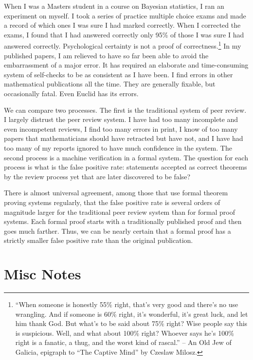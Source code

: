 \documentclass{llncs}
\begin{document}
When I was a Masters student in a course on Bayesian statistics, I ran an experiment on myself.   I took a series of practice multiple choice exams and made a record of which ones I was sure I had marked correctly.  When I corrected the exams, I found that I had answered correctly only 95\% of those I was sure I had answered correctly.  Psychological certainty is not a proof of correctness.\footnote{``When someone is honestly 55\% right, that's very good and there's no use wrangling.  And if someone is 60\% right, it's wonderful, it's great luck, and let him thank God.  But what's to be said about 75\% right?  Wise people say this is suspicious.  Well, and what about 100\% right?  Whoever says he's 100\% right is a fanatic, a thug, and the worst kind of rascal.'' -- An Old Jew of Galicia, epigraph to ``The Captive Mind'' by Czeslaw Milosz.}  In my published papers, I am relieved to have so far been able to avoid the embarrassment of a major error.  It has required an elaborate and time-consuming system of self-checks to be as consistent as I have been.  I find errors in other mathematical publications all the time.  They are generally fixable, but occasionally fatal.  Even Euclid has its errors. 

We can compare two processes.  The first is the traditional system of peer review.  
I largely distrust the peer review system.  I have had too many incomplete and even incompetent 
reviews, I find too many errors in print, I know of too many papers that mathematicians should have retracted but have not, and I have had too many of my reports ignored
to have much confidence in the system.  The second process is a machine verification in a 
formal system.  The question for
each process is what is the  false positive rate:  statements accepted as correct theorems by the review process yet that are later discovered to be false?

There is almost universal agreement, among those that use formal theorem proving systems
regularly, that the false positive rate is several orders of magnitude larger for
the traditional peer review system than for formal proof systems.  Each formal proof
starts with a traditionally published proof and then goes much farther.  Thus, we can be
nearly certain that a formal proof has a strictly smaller false positive rate than the original publication.



\section{Misc Notes}
\end{document}

